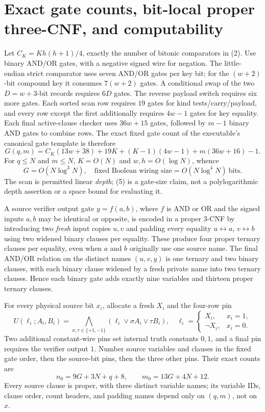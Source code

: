 \documentclass[11pt]{article}
\begin{document}
\section{Exact gate counts, bit-local proper three-CNF, and computability}
Let $C_K=Kh(h+1)/4$, exactly the number of bitonic comparators in (2).
Use binary AND/OR gates, with a negative signed wire for negation.
The little-endian strict comparator uses seven AND/OR gates per key bit;
for the $(w+2)$-bit compound key it consumes $7(w+2)$ gates. A
conditional swap of the two $D=w+3$-bit records requires $6D$ gates.
The reverse payload switch requires six more gates. Each sorted scan
row requires $19$ gates for kind tests/carry/payload, and every row
except the first additionally requires $4w-1$ gates for key equality.
Each final active-clause checker uses $36w+15$ gates, followed by
$m-1$ binary AND gates to combine rows. The exact fixed gate count of
the executable's canonical gate template is therefore
\[
 \boxed{G(q,m)= C_K(13w+38)
 +19K+(K-1)(4w-1)
 +m(36w+16)-1.}\tag{4}
\]
For $q\le N$ and $m\le N$, $K=O(N)$ and $w,h=O(\log N)$, whence
\[
 G=O(N\log^3N),\quad\text{fixed Boolean wiring size}
 =O(N\log^4N)\ \text{bits}.\tag{5}
\]
The scan is permitted linear \emph{depth}; (5) is a gate-size claim,
not a polylogarithmic depth assertion or a space bound for evaluating it.

A source verifier output gate $y=f(a,b)$, where $f$ is AND or OR and the
signed inputs $a,b$ may be identical or opposite, is encoded in a proper
3-CNF by introducing two \emph{fresh} input copies $u,v$ and padding
every equality $u\leftrightarrow a$, $v\leftrightarrow b$ using two
widened binary clauses per equality. These produce four proper ternary
clauses per equality, even when $a$ and $b$ originally use one source
name. The final AND/OR relation on the distinct names $(u,v,y)$ is
one ternary and two binary clauses, with each binary clause widened by
a fresh private name into two ternary clauses. Hence each binary gate
adds exactly nine variables and thirteen proper ternary clauses.

For every physical source bit $x_i$, allocate a fresh $X_i$ and the
four-row pin
\[
 U(\ell_i;A_i,B_i)=\bigwedge_{\sigma,\tau\in\{+1,-1\}}
 (\ell_i\vee \sigma A_i\vee\tau B_i),\quad
 \ell_i=\begin{cases}X_i,&x_i=1,\\\neg X_i,&x_i=0.\end{cases}\tag{6}
\]
Two additional constant-wire pins set internal truth constants $0,1$,
and a final pin requires the verifier output $1$. Number source variables
and clauses in the fixed gate order, then the source-bit pins, then the
three other pins. Their exact counts are
\[
 \boxed{n_0=9G+3N+q+8,\qquad m_0=13G+4N+12.}\tag{7}
\]
Every source clause is proper, with three distinct variable names;
its variable IDs, clause order, count headers, and padding names depend
only on $(q,m)$, not on $x$.
\end{document}
